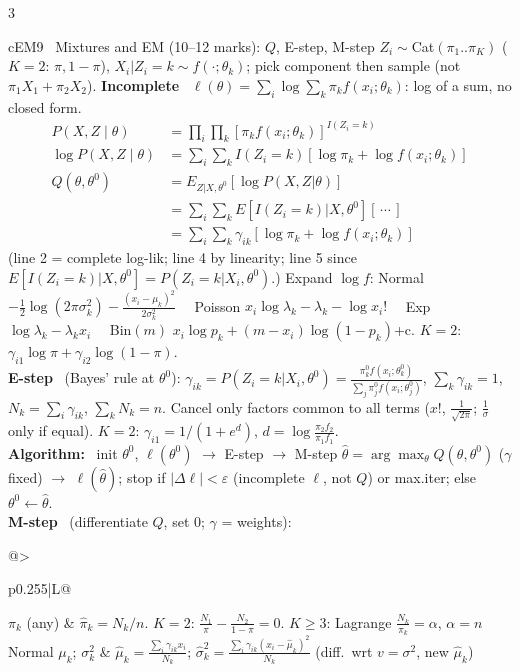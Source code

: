 \documentclass{article}
\newcommand{\h}[1]{{\bfseries #1}\ }
\newcommand{\sep}{\ \textbullet\ }
\begin{document}
\begin{multicols*}{3}
\begin{tb}{cEM}{9 \textbullet\ Mixtures and EM (10--12 marks): $Q$, E-step, M-step}
$Z_i\sim$Cat$(\pi_1..\pi_K)$ ($K{=}2$: $\pi,1-\pi$), $X_i|Z_i{=}k\sim f(\cdot;\theta_k)$; pick component then sample (not $\pi_1X_1+\pi_2X_2$).
\h{Incomplete} $\ell(\theta)=\sum_i\log\sum_k\pi_kf(x_i;\theta_k)$: log of a sum, no closed form.
\[\begin{aligned}
P(X,Z\mid\theta)&=\textstyle\prod_{i}\prod_{k}[\pi_kf(x_i;\theta_k)]^{I(Z_i=k)}\\
\log P(X,Z\mid\theta)&=\textstyle\sum_i\sum_kI(Z_i{=}k)[\log\pi_k+\log f(x_i;\theta_k)]\\
Q(\theta,\theta^0)&=E_{Z|X,\theta^0}[\log P(X,Z|\theta)]\\
&=\textstyle\sum_i\sum_kE[I(Z_i{=}k)|X,\theta^0][\,\cdots\,]\\
&=\textstyle\sum_i\sum_k\gamma_{ik}[\log\pi_k+\log f(x_i;\theta_k)]
\end{aligned}\]
(line 2 = complete log-lik; line 4 by linearity; line 5 since $E[I(Z_i{=}k)|X,\theta^0]=P(Z_i{=}k|X_i,\theta^0)$.) 
Expand $\log f$: Normal $-\frac12\log(2\pi\sigma_k^2)-\frac{(x_i-\mu_k)^2}{2\sigma_k^2}$ \sep Poisson $x_i\log\lambda_k-\lambda_k-\log x_i!$ \sep Exp $\log\lambda_k-\lambda_kx_i$ \sep Bin$(m)$ $x_i\log p_k+(m-x_i)\log(1-p_k)$+c. $K{=}2$: $\gamma_{i1}\log\pi+\gamma_{i2}\log(1-\pi)$.\\
\h{E-step} (Bayes' rule at $\theta^0$): $\gamma_{ik}=P(Z_i{=}k|X_i,\theta^0)=\frac{\pi_k^0f(x_i;\theta_k^0)}{\sum_j\pi_j^0f(x_i;\theta_j^0)}$, $\sum_k\gamma_{ik}=1$, $N_k=\sum_i\gamma_{ik}$, $\sum_kN_k=n$. Cancel only factors common to all terms ($x!$, $\frac1{\sqrt{2\pi}}$; $\frac1\sigma$ only if equal). $K{=}2$: $\gamma_{i1}=1/(1+e^d)$, $d=\log\frac{\pi_2f_2}{\pi_1f_1}$.\\
\h{Algorithm:} init $\theta^0$, $\ell(\theta^0)$ $\to$ E-step $\to$ M-step $\hat\theta=\arg\max_\theta Q(\theta,\theta^0)$ ($\gamma$ fixed) $\to$ $\ell(\hat\theta)$; stop if $|\Delta\ell|<\varepsilon$ (incomplete $\ell$, not $Q$) or max.iter; else $\theta^0\leftarrow\hat\theta$.\\
\h{M-step} (differentiate $Q$, set 0; $\gamma$ = weights):\\
\begin{tabularx}{\linewidth}{@{}>{\raggedright\arraybackslash}p{0.255\linewidth}|L@{}}
$\pi_k$ (any) & $\hat\pi_k=N_k/n$. $K{=}2$: $\frac{N_1}{\pi}-\frac{N_2}{1-\pi}=0$. $K{\ge}3$: Lagrange $\frac{N_k}{\pi_k}=\alpha$, $\alpha=n$\\
Normal $\mu_k$; $\sigma_k^2$ & $\hat\mu_k=\frac{\sum_i\gamma_{ik}x_i}{N_k}$; $\hat\sigma_k^2=\frac{\sum_i\gamma_{ik}(x_i-\hat\mu_k)^2}{N_k}$ (diff.\ wrt $v=\sigma^2$, new $\hat\mu_k$)\\

\end{tabularx}
\end{tb}
\end{multicols*}
\end{document}
